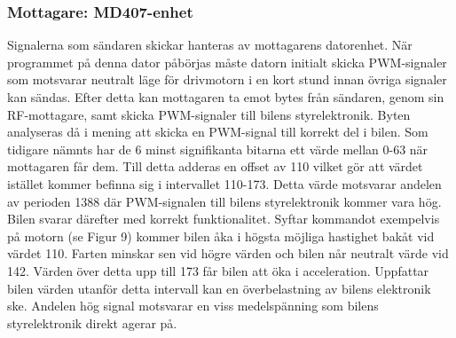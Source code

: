 \documentclass[a4paper]{article}
\begin{document}

\subsubsection{Mottagare: MD407-enhet}
Signalerna som sändaren skickar hanteras av mottagarens datorenhet. När programmet på denna dator påbörjas måste datorn initialt skicka PWM-signaler som motsvarar neutralt läge för drivmotorn i en kort stund innan övriga signaler kan sändas. Efter detta kan mottagaren ta emot bytes från sändaren, genom sin RF-mottagare, samt skicka PWM-signaler till bilens styrelektronik. Byten analyseras då i mening att skicka en PWM-signal till korrekt del i bilen. Som tidigare nämnts har de 6 minst signifikanta bitarna ett värde mellan 0-63 när mottagaren får dem. Till detta adderas en offset av 110 vilket gör att värdet istället kommer befinna sig i intervallet 110-173. Detta värde motsvarar andelen av perioden 1388 där PWM-signalen till bilens styrelektronik kommer vara hög. Bilen svarar därefter med korrekt funktionalitet. Syftar kommandot exempelvis på motorn (se Figur 9) kommer bilen åka i högsta möjliga hastighet bakåt vid värdet 110. Farten minskar sen vid högre värden och bilen når neutralt värde vid 142. Värden över detta upp till 173 får bilen att öka i acceleration. Uppfattar bilen värden utanför detta intervall kan en överbelastning av bilens elektronik ske. Andelen hög signal motsvarar en viss medelspänning som bilens styrelektronik direkt agerar på. 

\end{document}
